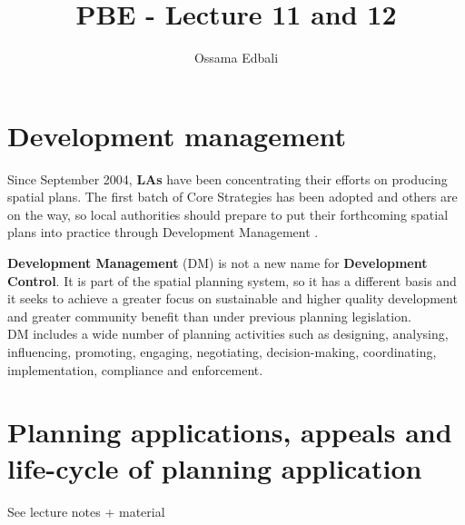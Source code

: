\documentclass{article}
\title{PBE - Lecture 11 and 12}
\author{Ossama Edbali}
\begin{document}
	
	\maketitle
	
	\section*{Development management}
	Since September 2004, \textbf{LAs} have been concentrating their efforts on
	producing spatial plans. The first batch of Core Strategies has been adopted and
	others are on the way, so local authorities should prepare to put their forthcoming
	spatial plans into practice through Development Management	.
	
	\textbf{Development Management} (DM) is not a new name for \textbf{Development Control}. It is part
	of the spatial planning system, so it has a different basis and it seeks to achieve
	a greater focus on sustainable and higher quality development and greater
	community benefit than under previous planning legislation. \\
	DM includes a wide number of planning activities such as
	designing, analysing, influencing, promoting, engaging, negotiating, decision-making,
	coordinating, implementation, compliance and enforcement.
	
	\section*{Planning applications, appeals and life-cycle of planning application}	
	See lecture notes + material	
	
\end{document}
